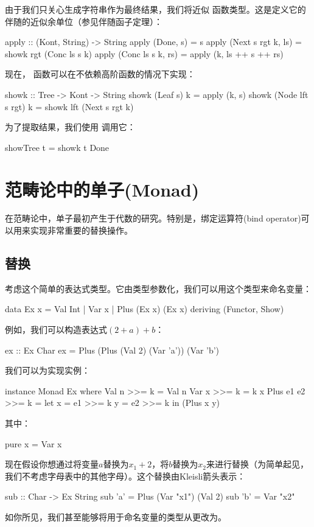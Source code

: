 \documentclass[DaoFP]{subfiles}
\begin{document}
由于我们只关心生成字符串作为最终结果，我们将近似  函数类型。这是定义它的伴随的近似余单位（参见伴随函子定理）：
\begin{haskell}
apply :: (Kont, String) -> String
apply (Done, s) = s
apply (Next s rgt k, ls) = showk rgt (Conc ls s k)
apply (Conc ls s k, rs) = apply (k, ls ++ s ++ rs)
\end{haskell}

现在， 函数可以在不依赖高阶函数的情况下实现：
\begin{haskell}
showk :: Tree -> Kont -> String
showk (Leaf s) k = apply (k, s)
showk (Node lft s rgt) k = showk lft (Next s rgt k)
\end{haskell}
为了提取结果，我们使用  调用它：
\begin{haskell}
showTree t = showk t Done
\end{haskell}

\section{范畴论中的单子(Monad)}

在范畴论中，单子最初产生于代数的研究。特别是，绑定运算符(bind operator)可以用来实现非常重要的替换操作。

\subsection{替换}

考虑这个简单的表达式类型。它由类型参数化，我们可以用这个类型来命名变量：
\begin{haskell}
data Ex x = Val Int 
          | Var x 
          | Plus (Ex x) (Ex x) 
 deriving (Functor, Show)
\end{haskell}
例如，我们可以构造表达式$(2 + a) + b$：
\begin{haskell}
ex :: Ex Char
ex = Plus (Plus (Val 2) (Var 'a')) (Var 'b')
\end{haskell}
我们可以为实现实例：
\begin{haskell}
instance Monad Ex where
  Val n >>= k = Val n
  Var x >>= k = k x
  Plus e1 e2 >>= k = 
    let x = e1 >>= k
        y = e2 >>= k
    in (Plus x y)
\end{haskell}
其中：
\begin{haskell}
  pure x = Var x 
\end{haskell}

现在假设你想通过将变量$a$替换为$x_1 + 2$，将$b$替换为$x_2$来进行替换（为简单起见，我们不考虑字母表中的其他字母）。这个替换由Kleisli箭头表示：
\begin{haskell}
sub :: Char -> Ex String
sub 'a' = Plus (Var "x1") (Val 2)
sub 'b' = Var "x2"
\end{haskell}
如你所见，我们甚至能够将用于命名变量的类型从更改为。
\end{document}
